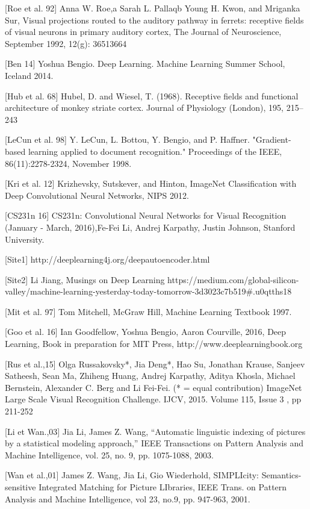 [Roe et al. 92] Anna W. Roe,a Sarah L. Pallaqb Young H. Kwon, and Mriganka Sur, Visual projections routed to the auditory pathway in ferrets: receptive fields of visual neurons in primary auditory cortex, The Journal of Neuroscience, September 1992, 12(g): 36513664

[Ben 14] Yoshua Bengio. Deep Learning. Machine Learning Summer School, Iceland 2014.

[Hub et al. 68] Hubel, D. and Wiesel, T. (1968). Receptive fields and functional architecture of monkey striate cortex. Journal of Physiology (London), 195, 215–243

[LeCun et al. 98] Y. LeCun, L. Bottou, Y. Bengio, and P. Haffner. "Gradient-based learning applied to document recognition." Proceedings of the IEEE, 86(11):2278-2324, November 1998. 

[Kri et al. 12] Krizhevsky, Sutskever, and Hinton, ImageNet Classification with Deep Convolutional Neural Networks, NIPS 2012.

[CS231n 16] CS231n: Convolutional Neural Networks for Visual Recognition (January - March, 2016),Fe-Fei Li, Andrej Karpathy, Justin Johnson, Stanford University.

[Site1] http://deeplearning4j.org/deepautoencoder.html

[Site2] Li Jiang, Musings on Deep Learning https://medium.com/global-silicon-valley/machine-learning-yesterday-today-tomorrow-3d3023c7b519\#.u0qtths18

[Mit et al. 97] Tom Mitchell, McGraw Hill, Machine Learning Textbook 1997.

[Goo et al. 16] Ian Goodfellow, Yoshua Bengio, Aaron Courville, 2016, Deep Learning, Book in preparation for MIT Press, http://www.deeplearningbook.org

[Rus et al.,15] Olga Russakovsky*, Jia Deng*, Hao Su, Jonathan Krause, Sanjeev Satheesh, Sean Ma, Zhiheng Huang, Andrej Karpathy, Aditya Khosla, Michael Bernstein, Alexander C. Berg and Li Fei-Fei. (* = equal contribution) ImageNet Large Scale Visual Recognition Challenge. IJCV, 2015. Volume 115, Issue 3 , pp 211-252 

[Li et Wan.,03] Jia Li, James Z. Wang, ``Automatic linguistic indexing of pictures by a statistical modeling approach,'' IEEE Transactions on Pattern Analysis and Machine Intelligence, vol. 25, no. 9, pp. 1075-1088, 2003.

[Wan et al.,01] James Z. Wang, Jia Li, Gio Wiederhold, SIMPLIcity: Semantics-sensitive Integrated Matching for Picture LIbraries, IEEE Trans. on Pattern Analysis and Machine Intelligence, vol 23, no.9, pp. 947-963, 2001.

